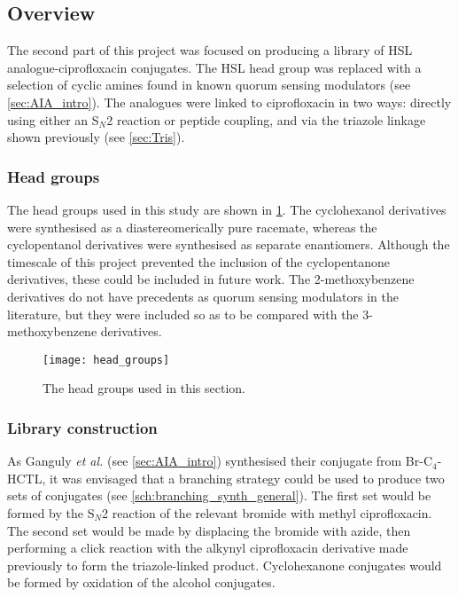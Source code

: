 \subsection{Overview}

The second part of this project was focused on producing a library of HSL analogue-ciprofloxacin conjugates. The HSL head group was replaced with a selection of cyclic amines found in known quorum sensing modulators (see \ref{sec:AIA_intro}). 
The analogues were linked to ciprofloxacin  in two ways: directly using either an S$_N$2 reaction or peptide coupling, and via the triazole linkage shown previously (see \ref{sec:Tris}).

\subsubsection{Head groups\label{sec:heads}}

The head groups used in this study are shown in \ref{fig:head_groups}. The cyclohexanol derivatives were synthesised as a diastereomerically pure racemate, whereas the cyclopentanol derivatives were synthesised as separate enantiomers. 
Although the timescale of this project prevented the inclusion of the cyclopentanone derivatives, these could be included in future work.
The 2-methoxybenzene derivatives do not have precedents as quorum sensing modulators in the literature, but they were included so as to be compared with the 3-methoxybenzene derivatives.

\begin{figure}[H]
	\begin{center}
		\texttt{[image: head\_groups]}
		\caption{The head groups used in this section.\label{fig:head_groups}}
	\end{center}
\end{figure}

\subsubsection{Library construction\label{sec:branch}}

As Ganguly \textit{et al.}\cite{Ganguly2011}  (see \ref{sec:AIA_intro}) synthesised their conjugate from Br-C$_4$-HCTL, it was envisaged that a branching strategy could be used to produce two sets of conjugates (see \ref{sch:branching_synth_general}). The first set would be formed by the S$_N$2 reaction of the relevant bromide with methyl ciprofloxacin. The second set would be made by displacing the bromide with azide, then performing a click reaction with the alkynyl ciprofloxacin derivative  made previously to form the triazole-linked product. Cyclohexanone conjugates would be formed by oxidation of the alcohol conjugates.

